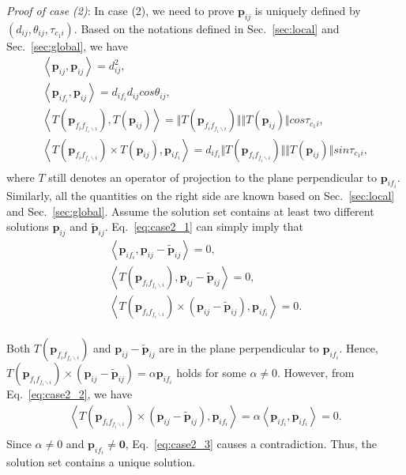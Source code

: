 \documentclass{article}
\begin{document}
\emph{Proof of case (2)}:
In case (2), we need to prove $\textbf{p}_{ij}$ is uniquely defined by $(d_{ij}, \theta_{ij}, \tau_{c_1i})$.
Based on the notations defined in Sec.~\ref{sec:local} and Sec.~\ref{sec:global}, we have
\begin{equation}
\begin{aligned}
    \left<\textbf{p}_{ij}, \textbf{p}_{ij} \right> = d^2_{ij}, \\
    \left<\textbf{p}_{if_i}, \textbf{p}_{ij} \right> = d_{if_i}d_{ij}cos\theta_{ij}, \\
    \left<T(\textbf{p}_{f_if_{f_i\backslash i}}), T(\textbf{p}_{ij}) \right> = \Vert T(\textbf{p}_{f_if_{f_i\backslash i}})\Vert \Vert T(\textbf{p}_{ij})\Vert cos\tau_{c_1i}, \\
    \left<T(\textbf{p}_{f_if_{f_i\backslash i}}) \times T(\textbf{p}_{ij}),  \textbf{p}_{if_i} \right> =d_{if_i} \Vert T(\textbf{p}_{f_if_{f_i\backslash i}})\Vert \Vert T(\textbf{p}_{ij})\Vert sin\tau_{c_1i}, \\
    \label{eq:case2_1}
\end{aligned}
\end{equation}
where $T$ still denotes an operator of projection to 
the plane perpendicular to $\textbf{p}_{if_i}$.
Similarly, all the quantities on the right side are known based on 
Sec.~\ref{sec:local} and Sec.~\ref{sec:global}. 
Assume the solution set
contains at least two different solutions $\textbf{p}_{ij}$
and $\widetilde{\textbf{p}}_{ij}$.
Eq.~\ref{eq:case2_1} can simply imply that
\begin{equation}
\begin{aligned}
    \left<\textbf{p}_{if_i}, \textbf{p}_{ij}- \widetilde{\textbf{p}}_{ij} \right> = 0, \\
    \left<T(\textbf{p}_{f_if_{f_i\backslash i}}), \textbf{p}_{ij}- \widetilde{\textbf{p}}_{ij} \right> = 0, \\
    \left<T(\textbf{p}_{f_if_{f_i\backslash i}}) \times (\textbf{p}_{ij}- \widetilde{\textbf{p}}_{ij}), \textbf{p}_{if_i}\right> = 0. \\
\label{eq:case2_2}
\end{aligned}
\end{equation}


Both $T(\textbf{p}_{f_if_{f_i\backslash i}})$ and 
$\textbf{p}_{ij}- \widetilde{\textbf{p}}_{ij}$
are in the plane perpendicular to $\textbf{p}_{if_i}$.
Hence, $T(\textbf{p}_{f_if_{f_i\backslash i}}) \times (\textbf{p}_{ij}- \widetilde{\textbf{p}}_{ij}) = \alpha \textbf{p}_{if_i}$
holds for some $\alpha\neq0$.
However, from Eq.~\ref{eq:case2_2}, we have
\begin{equation}
\begin{aligned}
    \left<T(\textbf{p}_{f_if_{f_i\backslash i}}) \times (\textbf{p}_{ij}- \widetilde{\textbf{p}}_{ij}), \textbf{p}_{if_i}\right>  = \alpha\left<\textbf{p}_{if_i}, \textbf{p}_{if_i} \right> = 0. \\
\label{eq:case2_3}
\end{aligned}
\end{equation}
Since $\alpha\neq0$ and $\textbf{p}_{if_i}\neq\textbf{0}$, Eq.~\ref{eq:case2_3} causes a contradiction. Thus, the solution set contains a unique solution.
\end{document}

